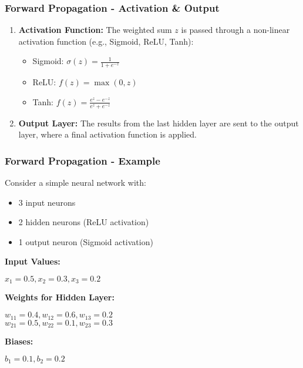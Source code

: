 \documentclass[aspectratio=169]{beamer}
\begin{document}
\begin{frame}[fragile]
    \frametitle{Forward Propagation - Activation & Output}
    \begin{enumerate}[resume]
        \item \textbf{Activation Function:} The weighted sum $z$ is passed through a non-linear activation function (e.g., Sigmoid, ReLU, Tanh):
        \begin{itemize}
            \item Sigmoid: $\sigma(z) = \frac{1}{1 + e^{-z}}$
            \item ReLU: $f(z) = \max(0, z)$
            \item Tanh: $f(z) = \frac{e^z - e^{-z}}{e^z + e^{-z}}$
        \end{itemize}
        \item \textbf{Output Layer:} The results from the last hidden layer are sent to the output layer, where a final activation function is applied.
    \end{enumerate}
\end{frame}

\begin{frame}[fragile]
    \frametitle{Forward Propagation - Example}
    Consider a simple neural network with:
    \begin{itemize}
        \item 3 input neurons
        \item 2 hidden neurons (ReLU activation)
        \item 1 output neuron (Sigmoid activation)
    \end{itemize}
    
    \textbf{Input Values:} 
    \begin{itemize}
        $x_1 = 0.5, x_2 = 0.3, x_3 = 0.2$
    \end{itemize}
    
    \textbf{Weights for Hidden Layer:}
    \begin{itemize}
        $w_{11} = 0.4, w_{12} = 0.6, w_{13} = 0.2$ \\
        $w_{21} = 0.5, w_{22} = 0.1, w_{23} = 0.3$
    \end{itemize}
    
    \textbf{Biases:} 
    \begin{itemize}
        $b_1 = 0.1, b_2 = 0.2$
    \end{itemize}
\end{frame}
\end{document}
